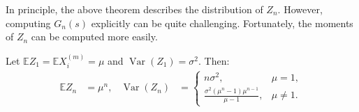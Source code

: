 \documentclass{huhtakm-template-book-v2}
\newcommand{\expect}{\mathbb{E}}
\DeclareMathOperator{\Var}{Var}
\begin{document}
    In principle, the above theorem describes the distribution of $Z_{n}$. However, computing $G_{n}(s)$ explicitly can be quite challenging. Fortunately, the moments of $Z_{n}$ can be computed more easily.
    \begin{lem}
        Let $\expect{Z_{1}} = \expect{X_{i}^{(m)}} = \mu$ and $\Var(Z_{1}) = \sigma^{2}$. Then:
        \begin{align*}
            \expect{Z_{n}} &= \mu^{n}, & \Var(Z_{n}) &= \begin{cases}
                n\sigma^{2}, &\mu = 1,\\
                \frac{\sigma^{2}(\mu^{n}-1)\mu^{n-1}}{\mu-1}, &\mu \neq 1.
            \end{cases}
        \end{align*}
    \end{lem}
\end{document}
